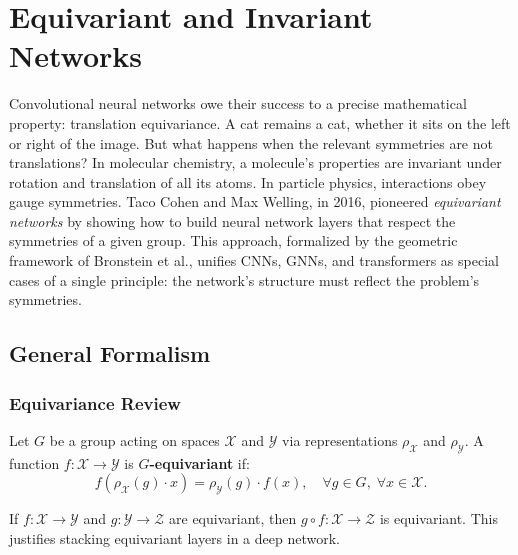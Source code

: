 \chapter{Equivariant and Invariant Networks}
\label{ch:equivariant}

Convolutional neural networks owe their success to a precise mathematical property: translation equivariance. A cat remains a cat, whether it sits on the left or right of the image. But what happens when the relevant symmetries are not translations? In molecular chemistry, a molecule's properties are invariant under rotation and translation of all its atoms. In particle physics, interactions obey gauge symmetries. Taco Cohen and Max Welling, in 2016, pioneered \emph{equivariant networks} by showing how to build neural network layers that respect the symmetries of a given group. This approach, formalized by the geometric framework of Bronstein et al., unifies CNNs, GNNs, and transformers as special cases of a single principle: the network's structure must reflect the problem's symmetries.

\section{General Formalism}

\subsection{Equivariance Review}

\begin{definition}
Let $G$ be a group acting on spaces $\mathcal{X}$ and $\mathcal{Y}$ via
representations $\rho_{\mathcal{X}}$ and $\rho_{\mathcal{Y}}$. A function
$f: \mathcal{X} \to \mathcal{Y}$ is \textbf{$G$-equivariant} if:
\[
    f(\rho_{\mathcal{X}}(g) \cdot x) = \rho_{\mathcal{Y}}(g) \cdot f(x),
    \quad \forall g \in G,\; \forall x \in \mathcal{X}.
\]
\end{definition}

\begin{proposition}
If $f: \mathcal{X} \to \mathcal{Y}$ and $g: \mathcal{Y} \to \mathcal{Z}$ are
equivariant, then $g \circ f: \mathcal{X} \to \mathcal{Z}$ is equivariant.
This justifies stacking equivariant layers in a deep network.
\end{proposition}

